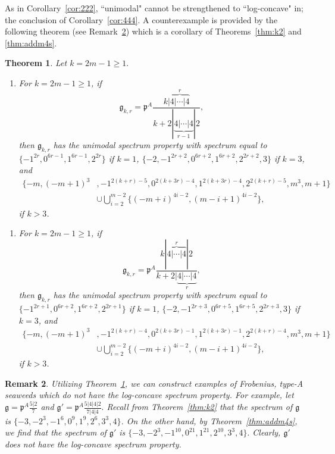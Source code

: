 \documentclass[letterpaper,10pt]{article}
\newtheorem{theorem}{Theorem}
\newtheorem{remark}[theorem]{Remark}
\begin{document}
As in Corollary~\ref{cor:222}, ``unimodal" cannot be strengthened to ``log-concave" in; the conclusion of Corollary~\ref{cor:444}. A counterexample is provided by the following theorem (see Remark~\ref{rem:nlcc2}) which is a corollary of Theorems~\ref{thm:k2} and \ref{thm:addm4s}.

\begin{theorem}\label{thm:base2ext} Let $k=2m-1\ge 1.$
\begin{enumerate}
    \item[\textup{(1)}] For $k=2m-1\ge 1$, if $$\mathfrak{g}_{k,r}=\mathfrak{p}^A\frac{k|\overbrace{4|\cdots|4}^r}{k+2|\underbrace{4|\cdots|4}_{r-1}|2},$$ then $\mathfrak{g}_{k,r}$ has the unimodal spectrum property with spectrum equal to $\{-1^{2r},0^{6r-1},1^{6r-1},2^{2r}\}$ if $k=1$, $\{-2,-1^{2r+2},0^{6r+2},1^{6r+2},2^{2r+2},3\}$ if $k=3$, and
    \begin{align*}
        \{-m,(-m+1)^3&,-1^{2(k+r)-5},0^{2(k+3r)-4},1^{2(k+3r)-4},2^{2(k+r)-5},m^3,m+1\}\\
        &\cup\bigcup_{i=2}^{m-2}\{(-m+i)^{4i-2},(m-i+1)^{4i-2}\},
    \end{align*}
    if $k>3$.
\end{enumerate}
\begin{enumerate}
\item[\textup{(2)}] For $k=2m-1\ge 1$, if $$\mathfrak{g}_{k,r}=\mathfrak{p}^A\frac{k|\overbrace{4|\cdots|4}^r|2}{k+2|\underbrace{4|\cdots|4}_{r}},$$ then $\mathfrak{g}_{k,r}$ has the unimodal spectrum property with spectrum equal to $\{-1^{2r+1},0^{6r+2},1^{6r+2},2^{2r+1}\}$ if $k=1$, $\{-2,-1^{2r+3},0^{6r+5},1^{6r+5},2^{2r+3},3\}$ if $k=3$, and
\begin{align*}
        \{-m,(-m+1)^3&,-1^{2(k+r)-4},0^{2(k+3r)-1},1^{2(k+3r)-1},2^{2(k+r)-4},m^3,m+1\}\\
        &\cup\bigcup_{i=2}^{m-2}\{(-m+i)^{4i-2},(m-i+1)^{4i-2}\},
    \end{align*}
    if $k>3$.
\end{enumerate}
\end{theorem}

\begin{remark}\label{rem:nlcc2}
    Utilizing Theorem~\ref{thm:base2ext}, we can construct examples of Frobenius, type-A seaweeds which do not have the log-concave spectrum property. For example, let $\mathfrak{g}=\mathfrak{p}^A\frac{5|2}{7}$ and $\mathfrak{g}'=\mathfrak{p}^A\frac{5|4|4|2}{7|4|4}.$ Recall from Theorem~\ref{thm:k2} that the spectrum of $\mathfrak{g}$ is $\{-3,-2^3,-1^6,0^9,1^9,2^6,3^3,4\}$. On the other hand, by Theorem~\ref{thm:addm4s}, we find that the spectrum of $\mathfrak{g}'$ is $\{-3,-2^3,-1^{10},0^{21},1^{21},2^{10},3^3,4\}.$ Clearly, $\mathfrak{g}'$ does not have the log-concave spectrum property.
\end{remark}
\end{document}
